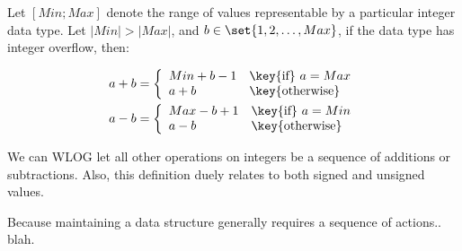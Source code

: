 \begin{definition}

Let $[Min;Max]$ denote the range of values representable by a particular
integer data type. Let $|Min|>|Max|$, and $b\in\set{1,2,\ldots,Max}$, if the
data type has integer overflow, then:

\begin{align}
a+b=\left\{
\begin{array}{ll}
Min+b-1&\text{\key{if}}\ a=Max\\
a+b&\text{\key{otherwise}}
\end{array}\right.\\
a-b=\left\{
\begin{array}{ll}
Max-b+1&\text{\key{if}}\ a=Min\\
a-b&\text{\key{otherwise}}
\end{array}\right.\\
\end{align}

\end{definition}

We can WLOG let all other operations on integers be a sequence of additions or
subtractions. Also, this definition duely relates to both signed and unsigned
values.

Because maintaining a data structure generally requires a sequence of actions..
blah.





